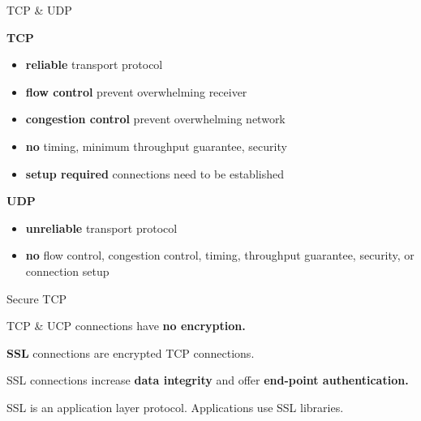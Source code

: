 \begin{topic}{TCP \& UDP}
\begin{multicols}{2}
\textbf{TCP}\\

\begin{itemize}
	\item \textbf{reliable} transport protocol
	\item \textbf{flow control} prevent overwhelming receiver
	\item \textbf{congestion control} prevent overwhelming network
	\item \textbf{no} timing, minimum throughput guarantee, security
	\item \textbf{setup required} connections need to be established
\end{itemize}

\columnbreak
\textbf{UDP}\\

\begin{itemize}
	\item \textbf{unreliable} transport protocol
	\item \textbf{no} flow control, congestion control, timing, throughput guarantee, security, or connection setup
\end{itemize}
\end{multicols}
\end{topic}

\begin{topic}{Secure TCP}

TCP \& UCP connections have \textbf{no encryption.}

\textbf{SSL} connections are encrypted TCP connections.

SSL connections increase \textbf{data integrity} and offer \textbf{end-point authentication.}

SSL is an application layer protocol. Applications use SSL libraries.

\end{topic}